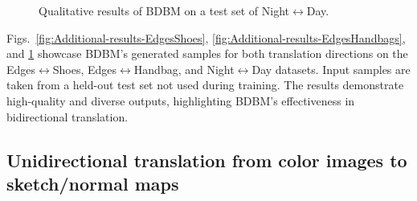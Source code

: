 \noindent 
\begin{figure}
\begin{centering}
{}
\par\end{centering}
\caption{Qualitative results of BDBM on a test set of Night$\leftrightarrow$Day.\label{fig:Additional-results-NightDay}}
\end{figure}

Figs.~\ref{fig:Additional-results-EdgesShoes}, \ref{fig:Additional-results-EdgesHandbags},
and \ref{fig:Additional-results-NightDay} showcase BDBM's generated
samples for both translation directions on the Edges$\leftrightarrow$Shoes,
Edges$\leftrightarrow$Handbag, and Night$\leftrightarrow$Day datasets.
Input samples are taken from a held-out test set not used during training.
The results demonstrate high-quality and diverse outputs, highlighting
BDBM's effectiveness in bidirectional translation.

\subsection{Unidirectional translation from color images to sketch/normal maps\label{subsec:Unidirectional-reverse-translation}}

